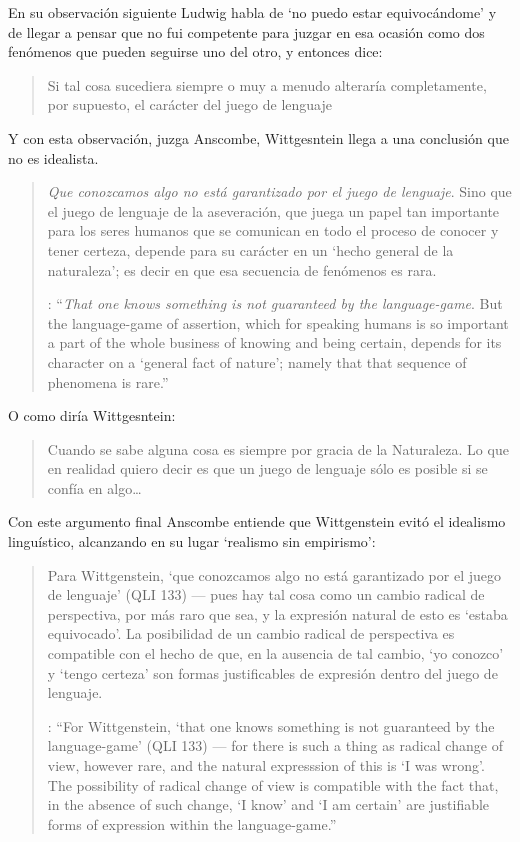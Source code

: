 En su observación siguiente Ludwig habla de \enquote*{no puedo estar equivocándome} y de llegar a pensar que no fui competente para juzgar en esa ocasión como dos fenómenos que pueden seguirse uno del otro, y entonces dice: \blockquote[{\cite[\S646]{wittgenstein1969oncertes}}
]{Si tal cosa sucediera siempre o muy a menudo alteraría completamente, por supuesto, el carácter del juego de lenguaje}. Y con esta observación, juzga Anscombe, Wittgesntein llega a una conclusión que no es idealista.  \blockquote[{\cite[133]{anscombe1981parmenides:qli}}: \enquote{\emph{That one knows something is not guaranteed by the language-game}. \textelp{} But the language-game of assertion, which for speaking humans is so important a part of the whole business of knowing and being certain, depends for its character on a `general fact of nature'; namely that that sequence of phenomena is rare.}]{\emph{Que conozcamos algo no está garantizado por el juego de lenguaje}. Sino que el juego de lenguaje de la aseveración, que juega un papel tan importante para los seres humanos que se comunican en todo el proceso de conocer y tener certeza, depende para su carácter en un `hecho general de la naturaleza'; es decir en que esa secuencia de fenómenos es rara.} O como diría Wittgesntein: \blockquote[{\cite[\S505; 509]{wittgenstein1969oncertes}}
]{Cuando se sabe alguna cosa es siempre por gracia de la Naturaleza. \textelp{} Lo que en realidad quiero decir es que un juego de lenguaje sólo es posible si se confía en algo\ldots}.

Con este argumento final Anscombe entiende que Wittgenstein evitó el idealismo linguístico, alcanzando en su lugar `realismo sin empirismo': \blockquote[{\cite[224]{teichmann2008ans}}: \enquote{For Wittgenstein, `that one knows something is not guaranteed by the language-game' (QLI 133) --- for there is such a thing as radical change of view, however rare, and the natural expresssion of this is `I was wrong'. The possibility of radical change of view is compatible with the fact that, in the absence of such change, `I know' and `I am certain' are justifiable forms of expression within the language-game.}]{Para Wittgenstein, `que conozcamos algo no está garantizado por el juego de lenguaje' (QLI 133) --- pues hay tal cosa como un cambio radical de perspectiva, por más raro que sea, y la expresión natural de esto es `estaba equivocado'. La posibilidad de un cambio radical de perspectiva es compatible con el hecho de que, en la ausencia de tal cambio, `yo conozco' y `tengo certeza' son formas justificables de expresión dentro del juego de lenguaje.}

